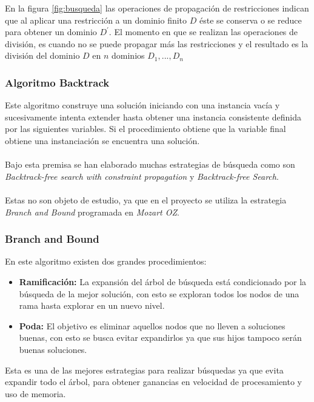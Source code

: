 En la figura \ref{fig:busqueda} las operaciones de propagación de restricciones indican que al aplicar una restricción a un dominio finito $D$ éste se conserva o se reduce para obtener un dominio $D^{'}$. El momento en que se realizan las operaciones de división, es cuando no se puede propagar más las restricciones y el resultado es la división del dominio $D$ en $n$ dominios $D_{1}, ... ,D_{n}$


\subsubsection{Algoritmo Backtrack}

Este algoritmo construye una solución iniciando con una instancia vacía y sucesivamente intenta extender hasta obtener una instancia consistente definida por las siguientes variables. Si el procedimiento obtiene que la variable final obtiene una instanciación se encuentra una solución.
\\\\
Bajo esta premisa se han elaborado muchas estrategias de búsqueda como son \textit{Backtrack-free search with constraint propagation} y \textit{Backtrack-free Search}.
\\\\
Estas no son objeto de estudio, ya que en el proyecto se utiliza la estrategia \textit{Branch and Bound} programada en \textit{Mozart OZ}.

\subsubsection{Branch and Bound}

En este algoritmo existen dos grandes procedimientos:

\begin{itemize}
	\item \textbf{Ramificación:} La expansión del árbol de búsqueda está condicionado por la búsqueda de la mejor solución, con esto se exploran todos los nodos de una rama hasta explorar en un nuevo nivel.
	\item \textbf{Poda:} El objetivo es eliminar aquellos nodos que no lleven a soluciones buenas, con esto se busca evitar expandirlos ya que sus hijos tampoco serán buenas soluciones.
\end{itemize}

Esta es una de las mejores estrategias para realizar búsquedas ya que evita expandir todo el árbol, para obtener ganancias en velocidad de procesamiento y uso de memoria.

